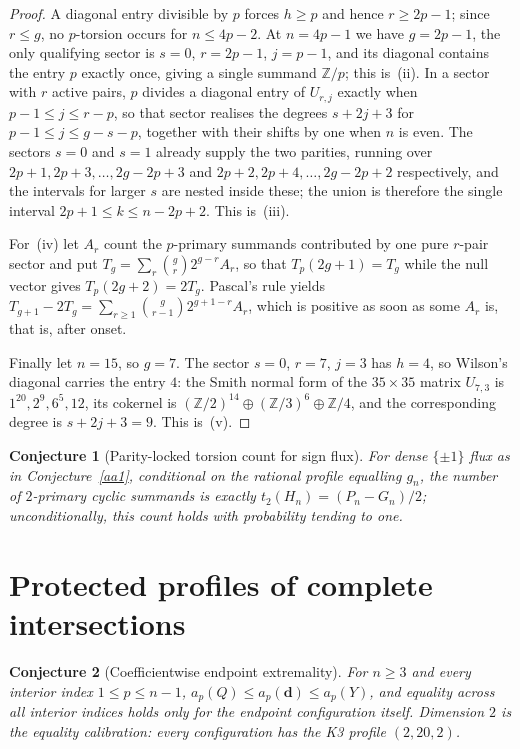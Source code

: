 \documentclass[11pt]{article}
\newtheorem{conjecture}{Conjecture}
\theoremstyle{definition}
\newcommand{\Z}{\mathbb Z}
\providecommand{\Z}{\mathbb Z}
\begin{document}
\begin{proof}
A diagonal entry divisible by $p$ forces $h\ge p$ and hence $r\ge2p-1$; since $r\le g$, no $p$-torsion occurs for $n\le4p-2$.  At $n=4p-1$ we have $g=2p-1$, the only qualifying sector is $s=0$, $r=2p-1$, $j=p-1$, and its diagonal contains the entry $p$ exactly once, giving a single summand $\Z/p$; this is~(ii).  In a sector with $r$ active pairs, $p$ divides a diagonal entry of $U_{r,j}$ exactly when $p-1\le j\le r-p$, so that sector realises the degrees $s+2j+3$ for $p-1\le j\le g-s-p$, together with their shifts by one when $n$ is even.  The sectors $s=0$ and $s=1$ already supply the two parities, running over $2p+1,2p+3,\ldots,2g-2p+3$ and $2p+2,2p+4,\ldots,2g-2p+2$ respectively, and the intervals for larger $s$ are nested inside these; the union is therefore the single interval $2p+1\le k\le n-2p+2$.  This is~(iii).

For~(iv) let $A_r$ count the $p$-primary summands contributed by one pure $r$-pair sector and put $T_g=\sum_r\binom gr2^{g-r}A_r$, so that $T_p(2g+1)=T_g$ while the null vector gives $T_p(2g+2)=2T_g$.  Pascal's rule yields $T_{g+1}-2T_g=\sum_{r\ge1}\binom g{r-1}2^{g+1-r}A_r$, which is positive as soon as some $A_r$ is, that is, after onset.

Finally let $n=15$, so $g=7$.  The sector $s=0$, $r=7$, $j=3$ has $h=4$, so Wilson's diagonal carries the entry $4$: the Smith normal form of the $35\times35$ matrix $U_{7,3}$ is $1^{20},2^{9},6^{5},12$, its cokernel is $(\Z/2)^{14}\oplus(\Z/3)^{6}\oplus\Z/4$, and the corresponding degree is $s+2j+3=9$.  This is~(v).
\end{proof}

\begin{conjecture}[Parity-locked torsion count for sign flux]\label{aa8}
For dense $\{\pm1\}$ flux as in Conjecture~\ref{aa1}, conditional on the rational profile equalling $g_n$, the number of $2$-primary cyclic summands is exactly $t_2(H_n)=(P_n-G_n)/2$; unconditionally, this count holds with probability tending to one.
\end{conjecture}

\section{Protected profiles of complete intersections}

\begin{conjecture}[Coefficientwise endpoint extremality]\label{aa9}
For $n\ge3$ and every interior index $1\le p\le n-1$, $a_p(Q)\le a_p(\mathbf d)\le a_p(Y)$, and equality across all interior indices holds only for the endpoint configuration itself.  Dimension $2$ is the equality calibration: every configuration has the K3 profile $(2,20,2)$.
\end{conjecture}
\end{document}
